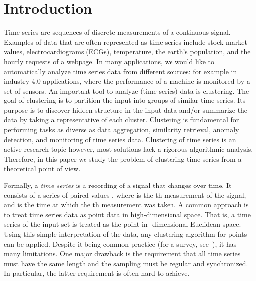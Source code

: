 \documentclass[11pt, letter]{article}
\begin{document}
\section{Introduction}

Time series are sequences of discrete measurements of a continuous signal. Examples of data that are often represented as time series include stock market values, electrocardiograms (ECGs), temperature, the earth's population, and the hourly requests of a webpage. In many applications, we would like to automatically analyze time series data from different sources: for example in industry 4.0 applications, where the performance of a machine is monitored by a set of sensors. An important tool to analyze (time series) data is clustering. The goal of clustering is to partition the input into groups of similar time series. Its purpose is to discover hidden structure in the input data and/or summarize the data by taking a representative of each cluster.  Clustering is fundamental for performing tasks as diverse as data aggregation, similarity retrieval, anomaly detection, and monitoring of time series data.  Clustering of time series is an active research topic
\cite{
ar-dcaa-2013,
Boecking2014129,
cmp-fcis-07, 
Hsu2014358,
jp-fdc-13,
Li2013243,
liao05survey,
tc-sbc-12,
Petitjean2011678,
rm-fcbwm-06, 
sf-mpfa-14,
hd-tsc-14,
wsh-cbc-06,
zt-MODIS-14,
qg-nadtw-12}
however, most solutions lack a rigorous algorithmic analysis. Therefore, in this paper we study the problem of clustering time series from a theoretical point of view. 


Formally, a \emph{time series} is a recording of a signal that changes over time. It consists of a series of paired values , where  is the th measurement of the signal, and  is the time at which the th measurement
was taken. A common approach is to treat time series data as point data in high-dimensional space.  That is, a time series
 of the input set is treated as the point
 in -dimensional Euclidean space. Using this simple interpretation of the data, any clustering algorithm for points can be applied. Despite it being common practice (for a survey, see~\cite{liao05survey}), it has many limitations. 
One major drawback is the requirement that all time series must have the same length and the sampling must be regular and synchronized. In particular, the latter requirement is often hard to achieve. 
\end{document}
